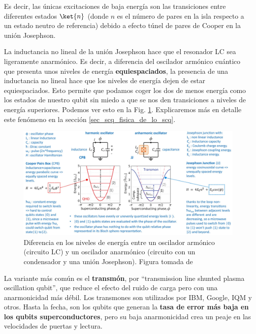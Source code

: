 Es decir, las únicas excitaciones de baja energía son las transiciones entre diferentes estados $\ket{n}$ (donde $n$ es el número de pares en la isla respecto a un estado neutro de referencia) debido a efecto túnel de pares de Cooper en la unión Josephson. 

La inductancia no lineal de la unión Josephson hace que el resonador LC sea ligeramente anarmónico. Es decir, a diferencia del oscilador armónico cuántico que presenta unos niveles de energía \textbf{equiespaciados}, la presencia de una inductancia no lineal hace que los niveles de energía dejen de estar equiespaciados. Esto permite que podamos coger los dos de menos energía como los estados de nuestro qubit sin miedo a que se nos den transiciones a niveles de energía superiores. Podemos ver esto en la Fig. \ref{Fig_scq_LC_energy_levels}. Explicaremos más en detalle este fenómeno en la sección \ref{sec_scq_fisica_de_lo_scq}.


	\begin{figure}[t]
	\centering 
	\includegraphics[width=1\linewidth]{Figuras/Fig_scq_LC_energy_levels.jpeg}
	\caption{Diferencia en los niveles de energía entre un oscilador armónico (circuito LC) y un oscilador anarmónico (circuito con un condensador y una unión Josephson). Figura tomada de \cite{bib_scq_ezratty2023perspective}}
	\label{Fig_scq_LC_energy_levels}
	\end{figure}

La variante más común es el \textbf{transmón}, por ``transmission line shunted plasma oscillation qubit'', que reduce el efecto del ruido de carga pero con una anarmonicidad más débil. Los transmones son utilizados por IBM, Google, IQM y otros. Hasta la fecha, son los qubits que generan la \textbf{tasa de error más baja en los qubits superconductores}, pero su baja anarmonicidad crea un peaje en las velocidades de puertas y lectura.

